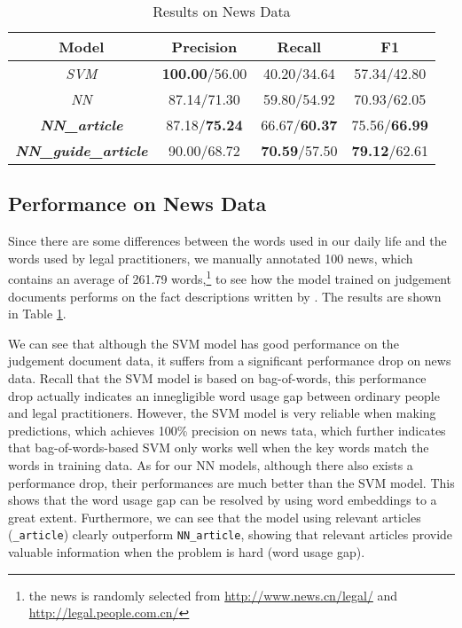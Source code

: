 \begin{table}
\centering
\small{
\begin{tabular}{|c|c|c|c|}
\hline
\textbf{Model}												& \textbf{Precision} 				& \textbf{Recall} 				& \textbf{F1} 	\\
\hline
\textit{SVM} 													& \textbf{100.00}/56.00			& 40.20/34.64  						& 57.34/42.80 				 	\\
\hline
\textit{NN}														& 87.14/71.30								& 59.80/54.92 						& 70.93/62.05					\\
\hline
\textbf{\textit{NN\_article}}					& 87.18/\textbf{75.24}			& 66.67/\textbf{60.37} 		& 75.56/\textbf{66.99}					\\
\hline
\textbf{\textit{NN\_guide\_article}} 	& 90.00/68.72 							& \textbf{70.59}/57.50 		& \textbf{79.12}/62.61 		 	\\
\hline
\end{tabular}
}
\caption{Results on News Data}
\label{tabble_news_results}
\end{table}


\subsection{Performance on News Data}
Since there are some differences between the words used in our daily life and the words used by legal practitioners, we manually annotated 100 news, which contains an average of 261.79 words,\footnote{the news is randomly selected from \url{http://www.news.cn/legal/} and \url{http://legal.people.com.cn/}} to see how the model trained on judgement documents performs on the fact descriptions written by . The results are shown in Table \ref{tabble_news_results}.

We can see that although the SVM model has good performance on the judgement document data, it suffers from a significant performance drop on news data.
Recall that the SVM model is based on bag-of-words, this performance drop actually indicates an innegligible word usage gap between ordinary people and legal practitioners. However, the SVM model is very reliable when making predictions, which achieves 100\% precision on news tata, which further indicates that bag-of-words-based SVM only works well when the key words match the words in training data.
As for our NN models, although there also exists a performance drop, their performances are much better than the SVM model. This shows that the word usage gap can be resolved by using word embeddings to a great extent. Furthermore, we can see that the model using relevant articles (\texttt{\_article}) clearly outperform \texttt{NN\_article}, showing that relevant articles provide valuable information when the problem is hard (word usage gap).

